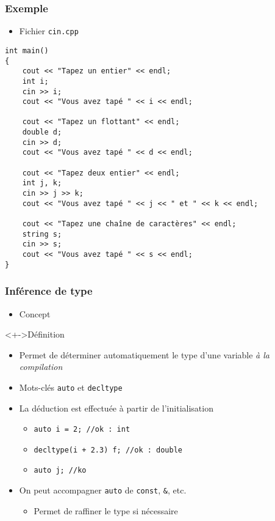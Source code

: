 \begin{frame}[containsverbatim]
\frametitle{Exemple}
\begin{itemize}
\item Fichier \texttt{cin.cpp}
\end{itemize}
\begin{lstlisting}
int main()
{
	cout << "Tapez un entier" << endl;
	int i;
	cin >> i;
	cout << "Vous avez tapé " << i << endl;

	cout << "Tapez un flottant" << endl;
	double d;
	cin >> d;
	cout << "Vous avez tapé " << d << endl;

	cout << "Tapez deux entier" << endl;
	int j, k;
	cin >> j >> k;
	cout << "Vous avez tapé " << j << " et " << k << endl;	

	cout << "Tapez une chaîne de caractères" << endl;
	string s;
	cin >> s;
	cout << "Vous avez tapé " << s << endl;	
}
\end{lstlisting}
\end{frame}

\begin{frame}
\frametitle{Inférence de type}
\begin{itemize}[<+->]
\item Concept \cpp
\end{itemize}
\begin{exampleblock}<+->{Définition}
	\begin{itemize}[<+->]
	\item Permet de déterminer automatiquement le type d'une variable \emph{à la compilation}
	\item Mots-clés \lstinline|auto| et \lstinline|decltype|
	\end{itemize}
\end{exampleblock}
\begin{itemize}[<+->]
\item La déduction est effectuée à partir de l'initialisation
	\begin{itemize}
	\item \lstinline|auto i = 2; //ok : int|
	\item \lstinline|decltype(i + 2.3) f; //ok : double|
	\item \lstinline|auto j; //ko|
	\end{itemize}
\item On peut accompagner \lstinline|auto| de \lstinline|const|, \texttt{\&}, etc.
	\begin{itemize}
	\item Permet de raffiner le type si nécessaire
	\end{itemize}
\end{itemize}
\end{frame}

